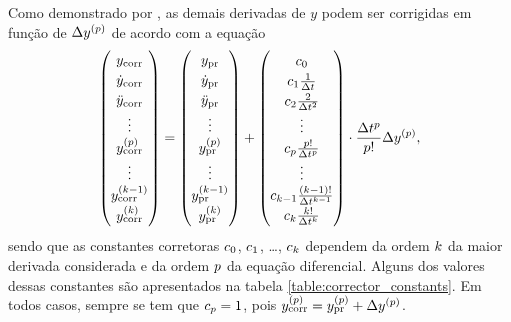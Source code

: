 Como demonstrado por , as demais derivadas de \(y\) podem ser corrigidas em função de \(\Delta \deriv{\eqOrder}{y}\) de acordo com a equação
\begin{equation} \label{eq:correction}
	\def\arraystretch{1.2}
	\begin{pmatrix}
		\corrected{\deriv{0}{y}} \\
		\corrected{\deriv{1}{y}} \\
		\corrected{\deriv{2}{y}} \\
		\vdots \\
		\corrected{\deriv{\eqOrder}{y}} \\
		\vdots \\
		\corrected{\deriv{\taylorOrder-1}{y}} \\
		\corrected{\deriv{\taylorOrder}{y}}
	\end{pmatrix}
	=
	\begin{pmatrix}
		\predicted{\deriv{0}{y}} \\
		\predicted{\deriv{1}{y}} \\
		\predicted{\deriv{2}{y}} \\
		\vdots \\
		\predicted{\deriv{\eqOrder}{y}} \\
		\vdots \\
		\predicted{\deriv{\taylorOrder-1}{y}} \\
		\predicted{\deriv{\taylorOrder}{y}}
	\end{pmatrix}
	+
	\begin{pmatrix}
		\correctorConstant{0} \\
		\correctorConstant{1}\frac{1}{\Dt} \\
		\correctorConstant{2}\frac{2}{\Dt^2} \\
		\vdots \\
		\correctorConstant{p}\frac{\eqOrder!}{\Dt^\eqOrder}\\
		\vdots \\
		\correctorConstant{\taylorOrder-1}\frac{\pqty{\taylorOrder-1}!}{\Dt^{\taylorOrder-1}}\\
		\correctorConstant{\taylorOrder}\frac{\taylorOrder!}{\Dt^\taylorOrder}
	\end{pmatrix}
	\cdot
	\dfrac{\Dt^\eqOrder}{\eqOrder!}\Delta \deriv{\eqOrder}{y},
\end{equation}
sendo que as constantes corretoras \(c_{0}\), \(c_{1}\), \dots, \(c_{k}\) dependem da ordem \(k\) da maior derivada considerada e da ordem \(p\) da equação diferencial. Alguns dos valores dessas constantes são apresentados na tabela \ref{table:corrector_constants}. Em todos casos, sempre se tem que \(c_{p}=1\), pois \(\corrected{\deriv{p}{y}} = \predicted{\deriv{p}{y}} + \Delta \deriv{\eqOrder}{y}\).

